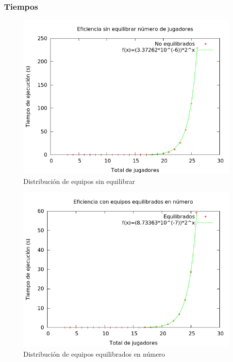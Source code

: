 \subsubsection{Tiempos}
\begin{figure}[H]
    \centering
    \includegraphics[scale=0.5]{../Equipos/Graficas/sinEquilibrar.png}
    \caption{Distribución de equipos sin equilibrar}
    \label{fig:Sin equilibrar}
\end{figure}

\vspace{0.5cm}

\begin{figure}[H]
    \centering
    \includegraphics[scale=0.5]{../Equipos/Graficas/equilibrar.png}
    \caption{Distribución de equipos equilibrados en número}
    \label{fig:Equilibrado}
\end{figure}

